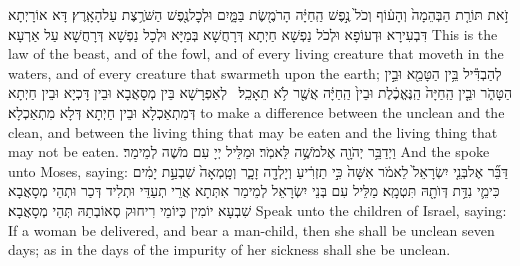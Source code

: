 {זֹ֣את תּוֹרַ֤ת הַבְּהֵמָה֙ וְהָע֔וֹף וְכֹל֙ נֶ֣פֶשׁ הַֽחַיָּ֔ה הָרֹמֶ֖שֶׂת בַּמָּ֑יִם וּלְכׇל\maqqaf נֶ֖פֶשׁ הַשֹּׁרֶ֥צֶת עַל\maqqaf הָאָֽרֶץ׃}
{דָּא אוֹרָיְתָא דִּבְעִירָא וּדְעוֹפָא וּלְכֹל נַפְשָׁא חַיְתָא דְּרָחֲשָׁא בְּמַיָּא וּלְכָל נַפְשָׁא דְּרָחֲשָׁא עַל אַרְעָא׃}
{This is the law of the beast, and of the fowl, and of every living creature that moveth in the waters, and of every creature that swarmeth upon the earth;}{}
{לְהַבְדִּ֕יל בֵּ֥ין הַטָּמֵ֖א וּבֵ֣ין הַטָּהֹ֑ר וּבֵ֤ין הַֽחַיָּה֙ הַֽנֶּאֱכֶ֔לֶת וּבֵין֙ הַֽחַיָּ֔ה אֲשֶׁ֖ר לֹ֥א תֵאָכֵֽל׃ \petucha }
{לְאַפְרָשָׁא בֵּין מְסָאֲבָא וּבֵין דָּכְיָא וּבֵין חַיְתָא דְּמִתְאַכְלָא וּבֵין חַיְתָא דְּלָא מִתְאַכְלָא׃}
{to make a difference between the unclean and the clean, and between the living thing that may be eaten and the living thing that may not be eaten.}{}
\newperek
{}
{וַיְדַבֵּ֥ר יְהֹוָ֖ה אֶל\maqqaf מֹשֶׁ֥ה לֵּאמֹֽר׃}
{וּמַלֵּיל יְיָ עִם מֹשֶׁה לְמֵימַר׃}
{And the \lord\space spoke unto Moses, saying:}{}
{דַּבֵּ֞ר אֶל\maqqaf בְּנֵ֤י יִשְׂרָאֵל֙ לֵאמֹ֔ר אִשָּׁה֙ כִּ֣י תַזְרִ֔יעַ וְיָלְדָ֖ה זָכָ֑ר וְטָֽמְאָה֙ שִׁבְעַ֣ת יָמִ֔ים כִּימֵ֛י נִדַּ֥ת דְּוֺתָ֖הּ תִּטְמָֽא׃}
{מַלֵּיל עִם בְּנֵי יִשְׂרָאֵל לְמֵימַר אִתְּתָא אֲרֵי תְעַדֵּי וּתְלִיד דְּכַר וּתְהֵי מְסָאֲבָא שִׁבְעָא יוֹמִין כְּיוֹמֵי רִיחוּק סְאוֹבְתַהּ תְּהֵי מְסָאֲבָא׃}
{Speak unto the children of Israel, saying: If a woman be delivered, and bear a man-child, then she shall be unclean seven days; as in the days of the impurity of her sickness shall she be unclean.}{}
